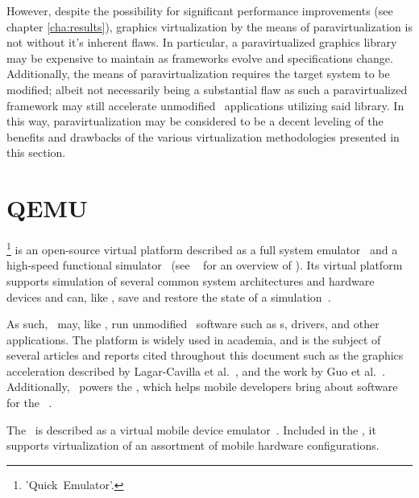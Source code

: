 However, despite the possibility for significant performance improvements (see chapter \ref{cha:results}), graphics virtualization by the means of paravirtualization is not without it's inherent flaws.
In particular, a paravirtualized graphics library may be expensive to maintain as frameworks evolve and specifications change.
Additionally, the means of paravirtualization requires the target system to be modified; albeit not necessarily being a substantial flaw as such a paravirtualized framework may still accelerate unmodified \dvttermtarget\ applications utilizing said library.
In this way, paravirtualization may be considered to be a decent leveling of the benefits and drawbacks of the various virtualization methodologies presented in this section.

\section{QEMU}
\label{sec:backgroundandrelatedwork_qemu}
\dvttermqemu \footnote{'Quick~Emulator'.} is an open-source virtual platform described as a full system emulator~ and a high-speed functional simulator~ (see ~ for an overview of \dvttermqemu ).
Its virtual platform supports simulation of several common system architectures and hardware devices and can, like \dvttermsimics , save and restore the state of a simulation~.

As such, \dvttermqemu\ may, like \dvttermsimics , run unmodified \dvttermtarget\ software such as \dvttermos s, drivers, and other applications.
The platform is widely used in academia, and is the subject of several articles and reports cited throughout this document such as the graphics acceleration described by Lagar-Cavilla et al.~, and the work by Guo et al.~.
Additionally, \dvttermqemu\ powers the \dvttermandroidemulator , which helps mobile developers bring about software for the \dvttermandroid\ \dvttermos .

The \dvttermandroidemulator\ is described as a virtual mobile device emulator~.
Included in the \dvttermandroidsdk , it supports virtualization of an assortment of mobile hardware configurations.

